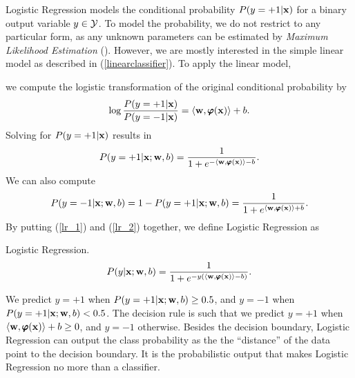{Logistic Regression models the conditional probability $P(y=+1|\mathbf {x})$ for a binary output variable $y\in\mathcal{Y}$.
To model the probability, we do not restrict to any particular form, as any unknown parameters can be estimated by \textit{Maximum Likelihood Estimation} (\mle).
However, we are mostly interested in the simple linear model as described in (\ref{linearclassifier}).
To apply the linear model,

we compute the logistic transformation of the original conditional probability by
\begin{align*}
	\log\frac{P(y=+1|\mathbf {x})}{P(y=-1|\mathbf {x})} = \langle \mathbf {w}, \pmb \varphi(\mathbf {x}) \rangle + b.
\end{align*}
Solving for $P(y=+1|\mathbf {x})$ results in 
\begin{align}
	P(y=+1|\mathbf {x};\mathbf {w},b) = \frac{1}{1+e^{ -\langle \mathbf {w}, \pmb \varphi(\mathbf {x}) \rangle-b }}. \label{lr_1}
\end{align}
We can also compute
\begin{align}
	P(y=-1|\mathbf {x};\mathbf {w},b)=1-P(y=+1|\mathbf {x};\mathbf {w},b)=\frac{1}{1+e^{ \langle \mathbf {w}, \pmb \varphi(\mathbf {x}) \rangle+b }}. \label{lr_2}
\end{align}
By putting (\ref{lr_1}) and (\ref{lr_2}) together, we define Logistic Regression as
\begin{definition}{Logistic Regression.} \label{logistic_regression}
	\begin{align*}
		P(y|\mathbf {x};\mathbf {w},b) = \frac{1}{1+e^{ -y(\langle \mathbf {w}, \pmb \varphi(\mathbf {x}) \rangle-b) }}.
	\end{align*}
\end{definition}
\noindent
We predict $y=+1$ when $P(y=+1|\mathbf {x};\mathbf {w},b)\ge0.5$, and $y=-1$ when $P(y=+1|\mathbf {x};\mathbf {w},b)<0.5$.
The decision rule is such that we predict $y=+1$ when $\langle \mathbf {w}, \pmb \varphi(\mathbf {x}) \rangle+b\ge0$, and $y=-1$ otherwise.
Besides the decision boundary, Logistic Regression can output the class probability as the the ``distance'' of the data point to the decision boundary.
It is the probabilistic output that makes Logistic Regression no more than a classifier.

}
